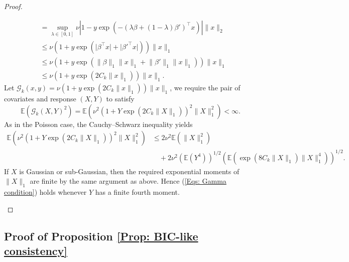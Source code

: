 \documentclass[12pt]{article}
\theoremstyle{remark}
\theoremstyle{plain}
\begin{document}
\begin{proof}
\begin{enumerate}
\begin{align*}
        &= \sup_{\lambda\in\left[0, 1\right]} \nu\left\lvert1 - y\exp\left(-(\lambda\beta + (1 - \lambda)\beta')^\top x\right)\right\rvert \lVert x\rVert_2 \\
        &\leq \nu\left(1 + y\exp\left(\lvert\beta^\top x\rvert + \lvert\beta'^\top x\rvert\right)\right) \lVert x\rVert_1 \\
        &\leq \nu\left(1 + y\exp(\lVert\beta\rVert_1\lVert x\rVert_1 + \lVert\beta'\rVert_1\lVert x\rVert_1)\right) \lVert x\rVert_1\\
        &\leq \nu\left(1 + y\exp(2C_k\lVert x\rVert_1)\right) \lVert x\rVert_1.
    \end{align*}
    Let $\mathcal{G}_k(x, y) = \nu\left(1 + y\exp(2C_k\lVert x\rVert_1)\right) \lVert x\rVert_1$, we require the pair of covariates and response $(X, Y)$ to satisfy
    \begin{equation}\label{Eqs: Gamma condition}
    \mathbb{E}\left(\mathcal{G}_k(X, Y)^2\right) = \mathbb{E}\left(\nu^2 \left(1 + Y\exp(2C_k\lVert X\rVert_1)\right)^2 \lVert X\rVert_1^2 \right)< \infty.
    \end{equation}
    As in the Poisson case, the Cauchy--Schwarz inequality yields
    \begin{align*}
        \mathbb{E}\left(\nu^2 \left(1 + Y\exp(2C_k\lVert X\rVert_1)\right)^2 \lVert X\rVert_1^2 \right)
        &\leq 2\nu^2\mathbb{E}\left(\lVert X\rVert_1^2\right)\\
        &\quad + 2\nu^2\left(\mathbb{E}(Y^4)\right)^{1/2}\left(\mathbb{E}\left(\exp(8C_k\lVert X\rVert_1)\lVert X\rVert_1^4\right)\right)^{1/2}.
    \end{align*}
    If $X$ is Gaussian or sub-Gaussian, then the required exponential moments of $\lVert X\rVert_1$ are finite by the same argument as above. Hence (\ref{Eqs: Gamma condition}) holds whenever $Y$ has a finite fourth moment.
\end{enumerate}
\end{proof}


\subsection{Proof of Proposition \ref{Prop: BIC-like consistency}}
\end{document}
